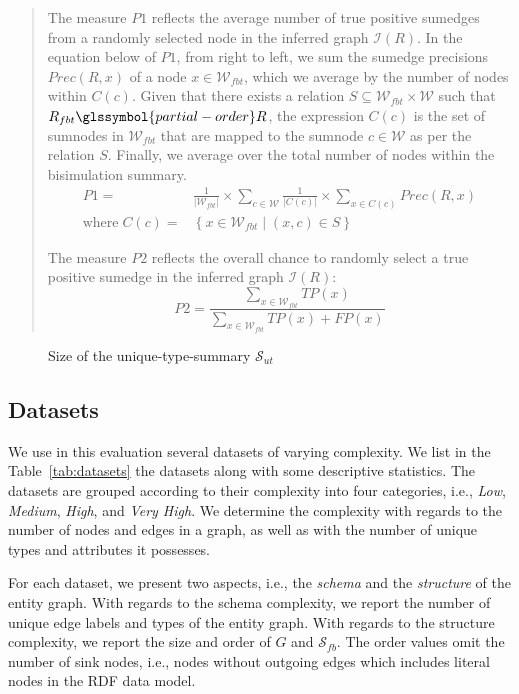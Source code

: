 \begin{quotation}
	The measure $P1$ reflects the average number of true positive sumedges from a randomly selected node in the inferred graph $\mathcal{I}(R)$. In the equation below of $P1$, from right to left, we sum the sumedge precisions $Prec(R, x)$ of a node $x\in \mathcal{W}_{fbt}$, which we average by the number of nodes within $C(c)$. Given that there exists a relation $S \subseteq \mathcal{W}_{fbt} \times \mathcal{W}$ such that $R_{fbt} \glssymbol{partial-order} R$, the expression $C(c)$ is the set of sumnodes in $\mathcal{W}_{fbt}$ that are mapped to the sumnode $c \in \mathcal{W}$ as per the relation $S$. Finally, we average over the total number of nodes within the bisimulation summary.
	$$
	\begin{aligned}
	P1 = & \frac{1}{\vert \mathcal{W}_{fbt} \vert} \times \sum_{c \in \mathcal{W}}{\frac{1}{\vert C(c) \vert} \times \sum_{x \in C(c)}{Prec(R, x)}} \\
	\text{where}\; C(c) = & \left\lbrace x \in \mathcal{W}_{fbt} \mid (x, c) \in S \right\rbrace
	\end{aligned}
	$$

	The measure $P2$ reflects the overall chance to randomly select a true positive sumedge in the inferred graph $\mathcal{I}(R)$:
	$$
	P2 = \frac{\sum_{x \in \mathcal{W}_{fbt}}{TP(x)}}{\sum_{x \in \mathcal{W}_{fbt}}{TP(x) + FP(x)}}
	$$
\end{quotation}

\begin{figure}
	\centering
	\resizebox{.8\textwidth}{!}{
		
	}
	\caption{Size of the \gls{unique-type-summary} $\mathcal{S}_{ut}$}
	\label{chap5:precision:fig:unique-type-summary-size}
\end{figure}
\subsection{Datasets}
\label{chap5:precision:eval:datasets}

We use in this evaluation several datasets of varying complexity. We list in the Table~\ref{tab:datasets} the datasets along with some descriptive statistics. The datasets are grouped according to their complexity into four categories, i.e., \emph{Low}, \emph{Medium}, \emph{High}, and \emph{Very High}. We determine the complexity with regards to the number of nodes and edges in a graph, as well as with the number of unique types and attributes it possesses.

For each dataset, we present two aspects, i.e., the \emph{schema} and the \emph{structure} of the entity graph. With regards to the schema complexity, we report the number of unique edge labels and types of the entity graph. With regards to the structure complexity, we report the size and order of $G$ and $\mathcal{S}_{fb}$. The order values omit the number of sink nodes, i.e., nodes without outgoing edges which includes literal nodes in the RDF data model.

